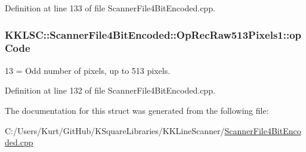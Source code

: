 Definition at line 133 of file Scanner\+File4\+Bit\+Encoded.\+cpp.

\subsubsection[{\texorpdfstring{op\+Code}{opCode}}]{ K\+K\+L\+S\+C\+::\+Scanner\+File4\+Bit\+Encoded\+::\+Op\+Rec\+Raw513\+Pixels1\+::op\+Code}\hypertarget{struct_scanner_file4_bit_encoded_1_1_op_rec_raw513_pixels1_a43ab3168471e51398cecd73dd08118d4}{}\label{struct_scanner_file4_bit_encoded_1_1_op_rec_raw513_pixels1_a43ab3168471e51398cecd73dd08118d4}
13 = Odd number of pixels, up to 513 pixels. 

Definition at line 132 of file Scanner\+File4\+Bit\+Encoded.\+cpp.



The documentation for this struct was generated from the following file\+:\begin{DoxyCompactItemize}
\item 
C\+:/\+Users/\+Kurt/\+Git\+Hub/\+K\+Square\+Libraries/\+K\+K\+Line\+Scanner/\hyperlink{_scanner_file4_bit_encoded_8cpp}{Scanner\+File4\+Bit\+Encoded.\+cpp}\end{DoxyCompactItemize}
